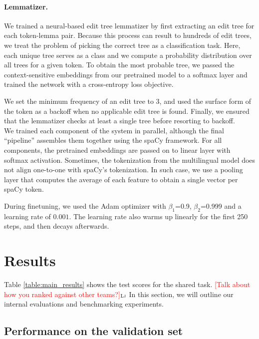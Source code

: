 \documentclass[11pt]{article}
\newcommand{\draftonly}[1]{#1}
\newcommand{\draftcomment}[3]{\draftonly{\textcolor{#2}{[#3]{$_{\textsc{#1}}$}}}}
\newcommand{\lj}[1]{\draftcomment{Lj}{red}{#1}}
\begin{document}
\paragraph{Lemmatizer.} 
We trained a neural-based edit tree lemmatizer \cite{muller-etal-2015-joint} by first extracting an edit tree for each token-lemma pair.
Because this process can result to hundreds of edit trees, we treat the problem of picking the correct tree as a classification task.
Here, each unique tree serves as a class and we compute a probability distribution over all trees for a given token.
To obtain the most probable tree, we passed the context-sensitive embeddings from our pretrained model to a softmax layer and trained the network with a cross-entropy loss objective.

We set the minimum frequency of an edit tree to 3, and used the surface form of the token as a backoff when no applicable edit tree is found.
Finally, we ensured that the lemmatizer checks at least a single tree before resorting to backoff. \\

\noindent We trained each component of the system in parallel, although the final ``pipeline'' assembles them together using the spaCy framework.
For all components, the pretrained embeddings are passed on to linear layer with softmax activation.
Sometimes, the tokenization from the multilingual model does not align one-to-one with spaCy's tokenization.
In such case, we use a pooling layer that computes the average of each feature to obtain a single vector per spaCy token.

During finetuning, we used the Adam optimizer with $\beta_1$=0.9, $\beta_2$=0.999 and a learning rate of $0.001$.
The learning rate also warms up linearly for the first 250 steps, and then decays afterwards.

\section{Results}

Table \ref{table:main_results} shows the test scores for the shared task.
\lj{Talk about how you ranked against other teams?}
In this section, we will outline our internal evaluations and benchmarking experiments.



\subsection{Performance on the validation set}
\end{document}
